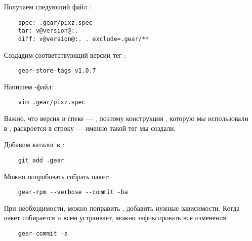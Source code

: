 Получаем следующий файл :
\begin{verbatim}
	spec: .gear/pixz.spec
	tar: v@version@:.
	diff: v@version@:. . exclude=.gear/**
\end{verbatim}

Создадим соответствующий версии тег :
\begin{verbatim}
	gear-store-tags v1.0.7
\end{verbatim} 

Напишем -файл:
\begin{verbatim}
	vim .gear/pixz.spec
\end{verbatim} 

Важно, что версия в спеке --- , поэтому конструкция , 
которую мы использовали в , раскроется в строку  --- 
именно такой тег  мы создали. 

Добавим каталог  в :
\begin{verbatim}
	git add .gear
\end{verbatim} 

Можно попробовать собрать пакет: 
\begin{verbatim}
	gear-rpm --verbose --commit -ba
\end{verbatim}

При необходимости, можно поправить , добавить нужные зависимости. 
Когда пакет собирается и всем устраивает, можно зафиксировать все изменения: 
\begin{verbatim}
	gear-commit -a
\end{verbatim}
